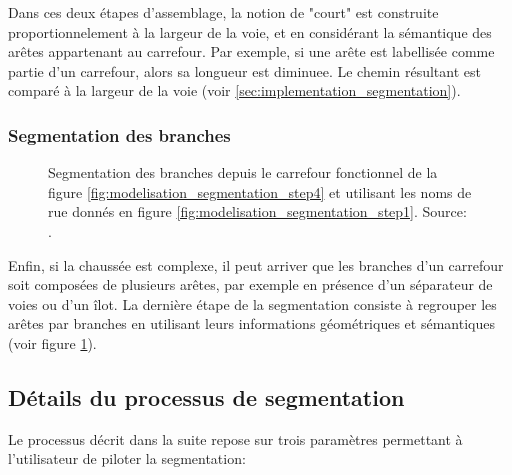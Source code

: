 \newpar{}

Dans ces deux étapes d'assemblage, la notion de "court" est construite proportionnelement à la largeur de la voie, et en considérant la sémantique des arêtes appartenant au carrefour. Par exemple, si une arête est labellisée comme partie d'un carrefour, alors sa longueur est diminuee. Le chemin résultant est comparé à la largeur de la voie (voir \ref{sec:implementation_segmentation}).

\subsubsection{Segmentation des branches}

\begin{figure}
    \centering
    \caption{Segmentation des branches depuis le carrefour fonctionnel de la figure \ref{fig:modelisation_segmentation_step4} et utilisant les noms de rue donnés en figure {\ref{fig:modelisation_segmentation_step1}}. Source: \cite{Favreau2022}.}
    \label{fig:modelisation_segmentation_step5}
\end{figure}

Enfin, si la chaussée est complexe, il peut arriver que les branches d'un carrefour soit composées de plusieurs arêtes, par exemple en présence d'un séparateur de voies ou d'un îlot. La dernière étape de la segmentation consiste à regrouper les arêtes par branches en utilisant leurs informations géométriques et sémantiques (voir figure \ref{fig:modelisation_segmentation_step5}).

\subsection{Détails du processus de segmentation}

Le processus décrit dans la suite repose sur trois paramètres permettant à l'utilisateur de piloter la segmentation:

